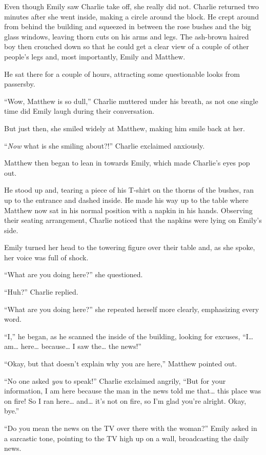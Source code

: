 Even though Emily saw Charlie take off, she really did not. Charlie returned two minutes after she went inside, making a circle around the block. He crept around from behind the building and squeezed in between the rose bushes and the big glass windows, leaving thorn cuts on his arms and legs. The ash-brown haired boy then crouched down so that he could get a clear view of a couple of other people’s legs and, most importantly, Emily and Matthew.

He sat there for a couple of hours, attracting some questionable looks from passersby.

“Wow, Matthew is so dull,” Charlie muttered under his breath, as not one single time did Emily laugh during their conversation.

But just then, she smiled widely at Matthew, making him smile back at her.

“\textit{Now} what is she smiling about?!” Charlie exclaimed anxiously.

Matthew then began to lean in towards Emily, which made Charlie’s eyes pop out.

He stood up and, tearing a piece of his T-shirt on the thorns of the bushes, ran up to the entrance and dashed inside. He made his way up to the table where Matthew now sat in his normal position with a napkin in his hands. Observing their seating arrangement, Charlie noticed that the napkins were lying on Emily’s side.

Emily turned her head to the towering figure over their table and, as she spoke, her voice was full of shock.

“What are you doing here?” she questioned.

“Huh?” Charlie replied.

“What are you doing here?” she repeated herself more clearly, emphasizing every word.

“I,” he began, as he scanned the inside of the building, looking for excuses, “I… am… here… because… I saw the… the news!”

“Okay, but that doesn’t explain why you are here,” Matthew pointed out.

“No one asked \textit{you} to speak!” Charlie exclaimed angrily, “But for your information, I am here because the man in the news told me that… this place was on fire! So I ran here… and… it’s not on fire, so I’m glad you’re alright. Okay, bye.”

“Do you mean the news on the TV over there with the woman?” Emily asked in a sarcastic tone, pointing to the TV high up on a wall, broadcasting the daily news.

